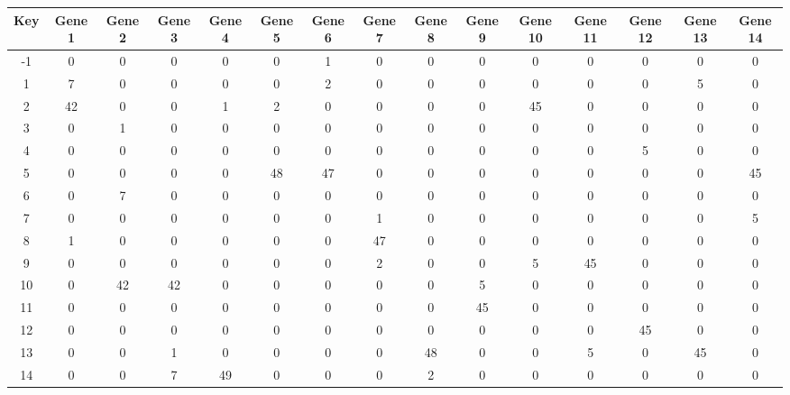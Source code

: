 \begin{tabular}{|c|c|c|c|c|c|c|c|c|c|c|c|c|c|c|}
\hline
Key & Gene 1 & Gene 2 & Gene 3 & Gene 4 & Gene 5 & Gene 6 & Gene 7 & Gene 8 & Gene 9 & Gene 10 & Gene 11 & Gene 12 & Gene 13 & Gene 14 \\
\hline
-1 & 0 & 0 & 0 & 0 & 0 & 1 & 0 & 0 & 0 & 0 & 0 & 0 & 0 & 0 \\
1 & 7 & 0 & 0 & 0 & 0 & 2 & 0 & 0 & 0 & 0 & 0 & 0 & 5 & 0 \\
2 & 42 & 0 & 0 & 1 & 2 & 0 & 0 & 0 & 0 & 45 & 0 & 0 & 0 & 0 \\
3 & 0 & 1 & 0 & 0 & 0 & 0 & 0 & 0 & 0 & 0 & 0 & 0 & 0 & 0 \\
4 & 0 & 0 & 0 & 0 & 0 & 0 & 0 & 0 & 0 & 0 & 0 & 5 & 0 & 0 \\
5 & 0 & 0 & 0 & 0 & 48 & 47 & 0 & 0 & 0 & 0 & 0 & 0 & 0 & 45 \\
6 & 0 & 7 & 0 & 0 & 0 & 0 & 0 & 0 & 0 & 0 & 0 & 0 & 0 & 0 \\
7 & 0 & 0 & 0 & 0 & 0 & 0 & 1 & 0 & 0 & 0 & 0 & 0 & 0 & 5 \\
8 & 1 & 0 & 0 & 0 & 0 & 0 & 47 & 0 & 0 & 0 & 0 & 0 & 0 & 0 \\
9 & 0 & 0 & 0 & 0 & 0 & 0 & 2 & 0 & 0 & 5 & 45 & 0 & 0 & 0 \\
10 & 0 & 42 & 42 & 0 & 0 & 0 & 0 & 0 & 5 & 0 & 0 & 0 & 0 & 0 \\
11 & 0 & 0 & 0 & 0 & 0 & 0 & 0 & 0 & 45 & 0 & 0 & 0 & 0 & 0 \\
12 & 0 & 0 & 0 & 0 & 0 & 0 & 0 & 0 & 0 & 0 & 0 & 45 & 0 & 0 \\
13 & 0 & 0 & 1 & 0 & 0 & 0 & 0 & 48 & 0 & 0 & 5 & 0 & 45 & 0 \\
14 & 0 & 0 & 7 & 49 & 0 & 0 & 0 & 2 & 0 & 0 & 0 & 0 & 0 & 0 \\
\hline
\end{tabular}